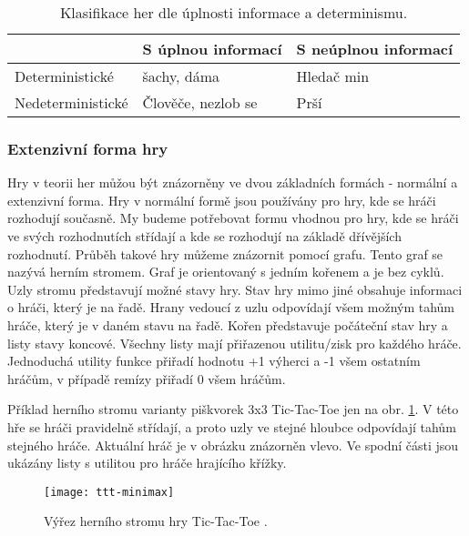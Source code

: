 \begin{table*}[b]\footnotesize
\vspace*{0mm}
\caption{{\label{tab:klasifikaceher}} Klasifikace her dle úplnosti informace a determinismu.}
\vspace*{0mm}
\label{shadowtable}
\begin{center}
\begin{tabular}{ l || l | l |}
 & S úplnou informací & S neúplnou informací \\
\hline
\hline
Deterministické & šachy, dáma & Hledač min \\ \hline
Nedeterministické  & Člověče, nezlob se & Prší \\ \hline
\end{tabular}
\end{center}
\end{table*}

\subsubsection{Extenzivní forma hry}

Hry v teorii her můžou být znázorněny ve dvou základních formách - normální a extenzivní forma. Hry v normální formě jsou používány pro hry, kde se hráči rozhodují současně. My budeme potřebovat formu vhodnou pro hry, kde se hráči ve svých rozhodnutích střídají a kde se rozhodují na základě dřívějších rozhodnutí. Průběh takové hry můžeme znázornit pomocí grafu. Tento graf se nazývá herním stromem. Graf je orientovaný s jedním kořenem a je bez cyklů. Uzly stromu představují možné stavy hry. Stav hry mimo jiné obsahuje informaci o hráči, který je na řadě. Hrany vedoucí z uzlu odpovídají všem možným tahům hráče, který je v daném stavu na řadě. Kořen představuje počáteční stav hry a listy stavy koncové. Všechny listy mají přiřazenou utilitu/zisk pro každého hráče. Jednoduchá utility funkce přiřadí hodnotu +1 výherci a -1 všem ostatním hráčům, v případě remízy přiřadí 0 všem hráčům.

Příklad herního stromu varianty piškvorek 3x3 Tic-Tac-Toe jen na obr. \ref{fig-ttt-minimax}. V této hře se hráči pravidelně střídají, a proto uzly ve stejné hloubce odpovídají tahům stejného hráče. Aktuální hráč je v obrázku znázorněn vlevo. Ve spodní části jsou ukázány listy s utilitou pro hráče hrajícího křížky.

\begin{figure}
  \centering
  \texttt{[image: ttt-minimax]}
	\caption{ Výřez herního stromu hry Tic-Tac-Toe \cite{tictactoe}. }
	\label{fig-ttt-minimax}
\end{figure}

